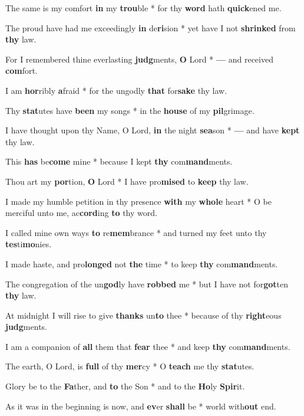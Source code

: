 \begin{multicols}{2}
	The same is my comfort \textbf{in} my \textbf{trou}ble * for thy \textbf{word} hath \textbf{quick}ened me.
	
	The proud have had me exceedingly \textbf{in} de\textbf{ri}sion * yet have I not \textbf{shrinked} from \textbf{thy} law.
	
	For I remembered thine everlasting \textbf{judg}ments, \textbf{O} Lord * \textbf{---} and received \textbf{com}fort.
	
	I am \textbf{hor}ribly \textbf{a}fraid * for the ungodly \textbf{that} for\textbf{sake} thy law.
	
	Thy \textbf{stat}utes have \textbf{been} my songs * in the \textbf{house} of my \textbf{pil}grimage.
	
	I have thought upon thy Name, O Lord, \textbf{in} the night \textbf{sea}son * \textbf{---} and have \textbf{kept} thy law.
	
	This \textbf{has} be\textbf{come} mine * because I kept \textbf{thy} com\textbf{mand}ments.
	
	Thou art my \textbf{por}tion, \textbf{O} Lord * I have pro\textbf{mised} to \textbf{keep} thy law.
	
	I made my humble petition in thy presence \textbf{with} my \textbf{whole} heart * O be merciful unto me, ac\textbf{cord}ing \textbf{to} thy word.
	
	I called mine own ways \textbf{to} re\textbf{mem}brance * and turned my feet unto thy \textbf{tes}ti\textbf{mo}nies.
	
	I made haste, and pro\textbf{longed} not \textbf{the} time * to keep \textbf{thy} com\textbf{mand}ments.
	
	The congregation of the un\textbf{god}ly have \textbf{robbed} me * but I have not for\textbf{got}ten \textbf{thy} law.
	
	At midnight I will rise to give \textbf{thanks} un\textbf{to} thee * because of thy \textbf{right}eous \textbf{judg}ments.
	
	I am a companion of \textbf{all} them that \textbf{fear} thee * and keep \textbf{thy} com\textbf{mand}ments.
	
	The earth, O Lord, is \textbf{full} of thy \textbf{mer}cy * O \textbf{teach} me thy \textbf{stat}utes.
	
	Glory be to the \textbf{Fa}ther, and \textbf{to} the Son * and to the \textbf{Ho}ly \textbf{Spir}it.
	
	As it was in the beginning is now, and \textbf{ev}er \textbf{shall} be * world with\textbf{out} end.
\end{multicols}